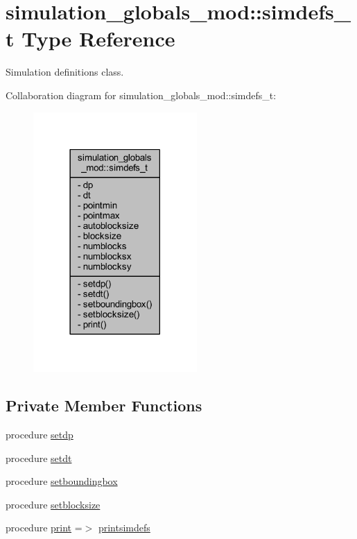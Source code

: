 \hypertarget{structsimulation__globals__mod_1_1simdefs__t}{}\section{simulation\+\_\+globals\+\_\+mod\+:\+:simdefs\+\_\+t Type Reference}
\label{structsimulation__globals__mod_1_1simdefs__t}


Simulation definitions class.  




Collaboration diagram for simulation\+\_\+globals\+\_\+mod\+:\+:simdefs\+\_\+t\+:\nopagebreak
\begin{figure}[H]
\begin{center}
\leavevmode
\includegraphics[width=177pt]{structsimulation__globals__mod_1_1simdefs__t__coll__graph}
\end{center}
\end{figure}
\subsection*{Private Member Functions}
\begin{DoxyCompactItemize}
\item 
procedure \mbox{\hyperlink{structsimulation__globals__mod_1_1simdefs__t_afca736d60d830235b7f84139eb5a1c0e}{setdp}}
\item 
procedure \mbox{\hyperlink{structsimulation__globals__mod_1_1simdefs__t_a80238515dc8566871b44ec89ee9fe1e7}{setdt}}
\item 
procedure \mbox{\hyperlink{structsimulation__globals__mod_1_1simdefs__t_a1f16ff24bfef17406b0d0ffe1d5bcce8}{setboundingbox}}
\item 
procedure \mbox{\hyperlink{structsimulation__globals__mod_1_1simdefs__t_ae55e67ff6ecd7045526f099a4bb77fac}{setblocksize}}
\item 
procedure \mbox{\hyperlink{structsimulation__globals__mod_1_1simdefs__t_a135110b50bcbd621d80df8f7b31fa60e}{print}} =$>$ \mbox{\hyperlink{namespacesimulation__globals__mod_ad331ccf019de7ed531e37c655600f90f}{printsimdefs}}
\end{DoxyCompactItemize}
